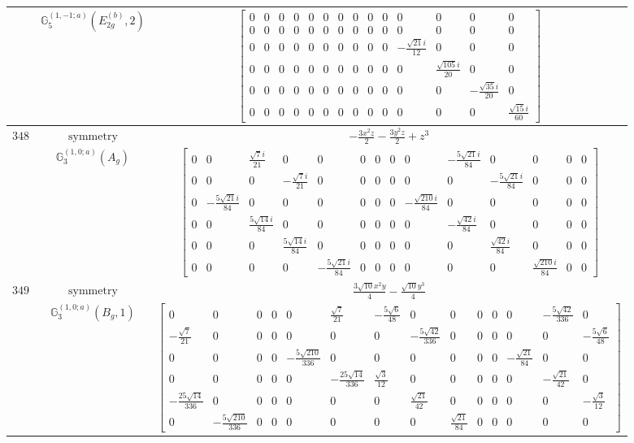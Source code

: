 \documentclass[fleqn,8pt,landscape]{jsarticle}
\begin{document}
\begin{longtable}{ccc}
$  $ & $ \mathbb{G}_{5}^{(1,-1;a)}(E_{2g}^{(b)},2) $ & $ \begin{bmatrix} 0 & 0 & 0 & 0 & 0 & 0 & 0 & 0 & 0 & 0 & 0 & 0 & 0 & 0 \\ 0 & 0 & 0 & 0 & 0 & 0 & 0 & 0 & 0 & 0 & 0 & 0 & 0 & 0 \\ 0 & 0 & 0 & 0 & 0 & 0 & 0 & 0 & 0 & 0 & - \frac{\sqrt{21} i}{12} & 0 & 0 & 0 \\ 0 & 0 & 0 & 0 & 0 & 0 & 0 & 0 & 0 & 0 & 0 & \frac{\sqrt{105} i}{20} & 0 & 0 \\ 0 & 0 & 0 & 0 & 0 & 0 & 0 & 0 & 0 & 0 & 0 & 0 & - \frac{\sqrt{35} i}{20} & 0 \\ 0 & 0 & 0 & 0 & 0 & 0 & 0 & 0 & 0 & 0 & 0 & 0 & 0 & \frac{\sqrt{15} i}{60} \end{bmatrix} $ \\ \hline
$ 348 $ & $ \text{symmetry} $ & $ - \frac{3 x^{2} z}{2} - \frac{3 y^{2} z}{2} + z^{3} $ \\
$  $ & $ \mathbb{G}_{3}^{(1,0;a)}(A_{g}) $ & $ \begin{bmatrix} 0 & 0 & \frac{\sqrt{7} i}{21} & 0 & 0 & 0 & 0 & 0 & 0 & - \frac{5 \sqrt{21} i}{84} & 0 & 0 & 0 & 0 \\ 0 & 0 & 0 & - \frac{\sqrt{7} i}{21} & 0 & 0 & 0 & 0 & 0 & 0 & - \frac{5 \sqrt{21} i}{84} & 0 & 0 & 0 \\ 0 & - \frac{5 \sqrt{21} i}{84} & 0 & 0 & 0 & 0 & 0 & 0 & - \frac{\sqrt{210} i}{84} & 0 & 0 & 0 & 0 & 0 \\ 0 & 0 & \frac{5 \sqrt{14} i}{84} & 0 & 0 & 0 & 0 & 0 & 0 & - \frac{\sqrt{42} i}{84} & 0 & 0 & 0 & 0 \\ 0 & 0 & 0 & \frac{5 \sqrt{14} i}{84} & 0 & 0 & 0 & 0 & 0 & 0 & \frac{\sqrt{42} i}{84} & 0 & 0 & 0 \\ 0 & 0 & 0 & 0 & - \frac{5 \sqrt{21} i}{84} & 0 & 0 & 0 & 0 & 0 & 0 & \frac{\sqrt{210} i}{84} & 0 & 0 \end{bmatrix} $ \\ \hline
$ 349 $ & $ \text{symmetry} $ & $ \frac{3 \sqrt{10} x^{2} y}{4} - \frac{\sqrt{10} y^{3}}{4} $ \\
$  $ & $ \mathbb{G}_{3}^{(1,0;a)}(B_{g},1) $ & $ \begin{bmatrix} 0 & 0 & 0 & 0 & 0 & \frac{\sqrt{7}}{21} & - \frac{5 \sqrt{6}}{48} & 0 & 0 & 0 & 0 & 0 & - \frac{5 \sqrt{42}}{336} & 0 \\ - \frac{\sqrt{7}}{21} & 0 & 0 & 0 & 0 & 0 & 0 & - \frac{5 \sqrt{42}}{336} & 0 & 0 & 0 & 0 & 0 & - \frac{5 \sqrt{6}}{48} \\ 0 & 0 & 0 & 0 & - \frac{5 \sqrt{210}}{336} & 0 & 0 & 0 & 0 & 0 & 0 & - \frac{\sqrt{21}}{84} & 0 & 0 \\ 0 & 0 & 0 & 0 & 0 & - \frac{25 \sqrt{14}}{336} & \frac{\sqrt{3}}{12} & 0 & 0 & 0 & 0 & 0 & - \frac{\sqrt{21}}{42} & 0 \\ - \frac{25 \sqrt{14}}{336} & 0 & 0 & 0 & 0 & 0 & 0 & \frac{\sqrt{21}}{42} & 0 & 0 & 0 & 0 & 0 & - \frac{\sqrt{3}}{12} \\ 0 & - \frac{5 \sqrt{210}}{336} & 0 & 0 & 0 & 0 & 0 & 0 & \frac{\sqrt{21}}{84} & 0 & 0 & 0 & 0 & 0 \end{bmatrix} $ \\ \hline

\end{longtable}
\end{document}

